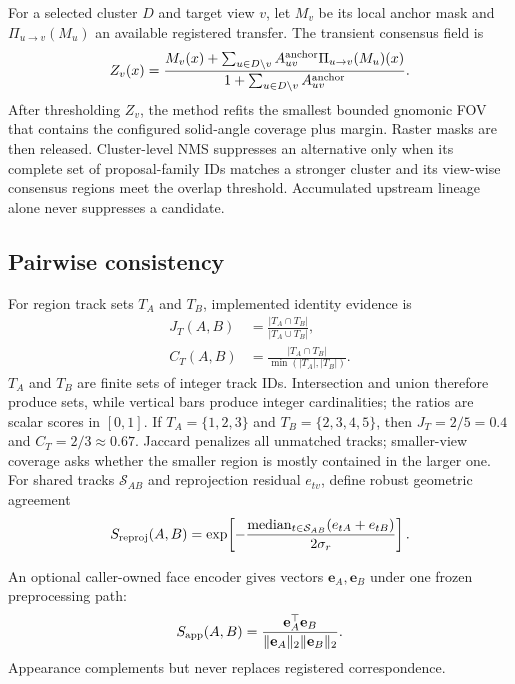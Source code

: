 \documentclass[a4paper,9pt]{extarticle}
\begin{document}
For a selected cluster $D$ and target view $v$, let $M_v$ be its local anchor
mask and $\Pi_{u\rightarrow v}(M_u)$ an available registered transfer. The
transient consensus field is
\begin{equation}
 Z_v(x)=\frac{M_v(x)+
 \sum_{u\in D\setminus v}A^{\rm anchor}_{uv}
 \Pi_{u\rightarrow v}(M_u)(x)}
 {1+\sum_{u\in D\setminus v}A^{\rm anchor}_{uv}}.
 \label{eq:anchorconsensus}
\end{equation}
After thresholding $Z_v$, the method refits the smallest bounded gnomonic FOV
that contains the configured solid-angle coverage plus margin. Raster masks
are then released. Cluster-level NMS suppresses an alternative only when its
complete set of proposal-family IDs matches a stronger cluster and its
view-wise consensus regions meet the overlap threshold. Accumulated upstream
lineage alone never suppresses a candidate.

\subsection{Pairwise consistency}

For region track sets $T_A$ and $T_B$, implemented identity evidence is
\begin{align}
 J_T(A,B)&=\frac{|T_A\cap T_B|}{|T_A\cup T_B|}, \label{eq:jaccard}\\
 C_T(A,B)&=\frac{|T_A\cap T_B|}
 {\min(|T_A|,|T_B|)}. \label{eq:trackcoverage}
\end{align}
$T_A$ and $T_B$ are finite sets of integer track IDs. Intersection and union
therefore produce sets, while vertical bars produce integer cardinalities; the
ratios are scalar scores in $[0,1]$. If
$T_A=\{1,2,3\}$ and $T_B=\{2,3,4,5\}$, then
$J_T=2/5=0.4$ and $C_T=2/3\approx0.67$. Jaccard penalizes all unmatched
tracks; smaller-view coverage asks whether the smaller region is mostly
contained in the larger one.
For shared tracks $\mathcal S_{AB}$ and reprojection residual
$e_{tv}$, define robust geometric agreement
\begin{equation}
 S_{\rm reproj}(A,B)=
 \exp\!\left[
 -\frac{\operatorname{median}_{t\in\mathcal S_{AB}}
 (e_{tA}+e_{tB})}{2\sigma_r}\right].
 \label{eq:reproj}
\end{equation}

An optional caller-owned face encoder gives vectors
$\mathbf e_A,\mathbf e_B$ under one frozen preprocessing path:
\begin{equation}
 S_{\rm app}(A,B)=
 \frac{\mathbf e_A^\top\mathbf e_B}
 {\|\mathbf e_A\|_2\|\mathbf e_B\|_2}.
 \label{eq:cosine}
\end{equation}
Appearance complements but never replaces registered correspondence.
\end{document}
